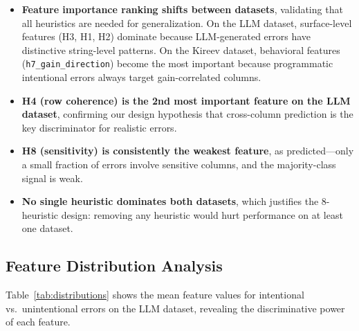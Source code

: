 \documentclass[11pt,a4paper]{article}
\newcommand{\feat}[1]{\texttt{#1}}
\begin{document}
\begin{itemize}[nosep]
  \item \textbf{Feature importance ranking shifts between datasets}, validating
        that all heuristics are needed for generalization.  On the LLM dataset,
        surface-level features (H3, H1, H2) dominate because LLM-generated
        errors have distinctive string-level patterns.  On the Kireev dataset,
        behavioral features (\feat{h7\_gain\_direction}) become the most
        important because programmatic intentional errors always target
        gain-correlated columns.
  \item \textbf{H4 (row coherence) is the 2nd most important feature on the
        LLM dataset}, confirming our design hypothesis that cross-column
        prediction is the key discriminator for realistic errors.
  \item \textbf{H8 (sensitivity) is consistently the weakest feature}, as
        predicted---only a small fraction of errors involve sensitive columns,
        and the majority-class signal is weak.
  \item \textbf{No single heuristic dominates both datasets}, which justifies
        the 8-heuristic design: removing any heuristic would hurt performance
        on at least one dataset.
\end{itemize}

\subsection{Feature Distribution Analysis}

Table~\ref{tab:distributions} shows the mean feature values for intentional
vs.\ unintentional errors on the LLM dataset, revealing the discriminative
power of each feature.
\end{document}
